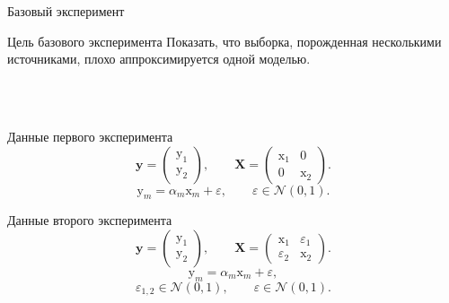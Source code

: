 \documentclass[9pt,pdf,hyperref={unicode}]{beamer}
\begin{document}
\begin{frame}{Базовый эксперимент}
\begin{block}{Цель базового эксперимента}
Показать, что выборка, порожденная несколькими источниками, плохо аппроксимируется одной моделью.
\end{block}\\
~\\
\begin{minipage}[t]{0.49\textwidth} 
   \begin{center}
   Данные первого эксперимента
   \[\mathbf{y} = \begin{pmatrix}
    \mathrm{y}_1\\
    \mathrm{y}_2
    \end{pmatrix}, \qquad\mathbf{X} = \begin{pmatrix}
    \mathrm{x}_1 & 0\\
    0 & \mathrm{x}_2
    \end{pmatrix}.\]
    \[\mathrm{y}_m = \alpha_{m}\mathrm{x}_m+ \varepsilon, \qquad \varepsilon \in \mathcal{N}(0, 1).\]
    \end{center}
    \end{minipage}%
    \begin{minipage}[t]{0.49\textwidth} 
    \begin{center}
    Данные второго эксперимента
   \[\mathbf{y} = \begin{pmatrix}
    \mathrm{y}_1\\
    \mathrm{y}_2
    \end{pmatrix}, \qquad\mathbf{X} = \begin{pmatrix}
    \mathrm{x}_1 & \varepsilon_1\\
    \varepsilon_2 & \mathrm{x}_2
    \end{pmatrix}.\]
    \[\mathrm{y}_m = \alpha_{m}\mathrm{x}_m+ \varepsilon,\] 
    \[\varepsilon_{1,2} \in \mathcal{N}(0,1), \qquad \varepsilon \in \mathcal{N}(0, 1).\]
   \end{center}
    
    
    \end{minipage}  
\end{frame}
\end{document}
